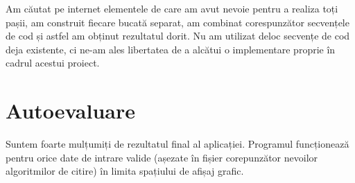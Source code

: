 \documentclass{article}
\begin{document}
\hspace{0.5cm}Am căutat pe internet elementele de care am avut nevoie pentru a realiza toți pașii, am construit fiecare bucată separat, am combinat corespunzător secvențele de cod și astfel am obținut rezultatul dorit. Nu am utilizat deloc secvențe de cod deja existente, ci ne-am ales libertatea de a alcătui o implementare proprie în cadrul acestui proiect.

\section*{Autoevaluare}
\hspace{1cm}Suntem foarte mulțumiți de rezultatul final al aplicației. Programul funcționează pentru orice date de intrare valide (așezate în fișier corepunzător nevoilor algoritmilor de citire) în limita spațiului de afișaj grafic.
\end{document}
